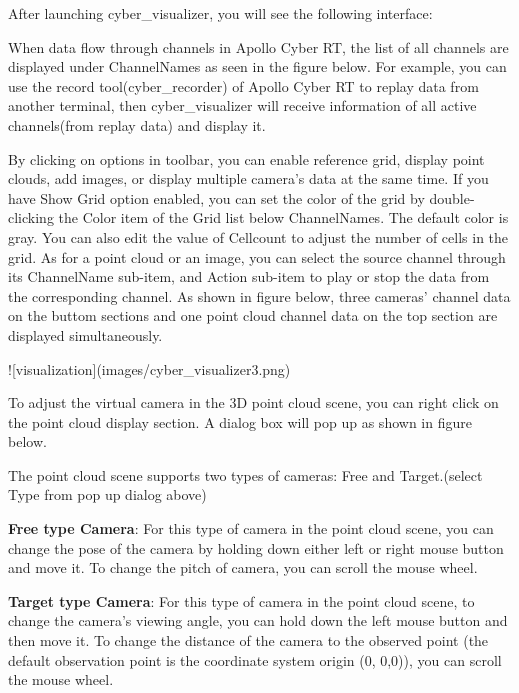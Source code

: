 \begin{DoxyItemize}
\item After launching cyber\-\_\-visualizer, you will see the following interface\-:


\item When data flow through channels in Apollo Cyber R\-T, the list of all channels are displayed under {\ttfamily Channel\-Names} as seen in the figure below. For example, you can use the record tool(cyber\-\_\-recorder) of Apollo Cyber R\-T to replay data from another terminal, then {\ttfamily cyber\-\_\-visualizer} will receive information of all active channels(from replay data) and display it.


\item By clicking on options in toolbar, you can enable reference grid, display point clouds, add images, or display multiple camera's data at the same time. If you have {\ttfamily Show Grid} option enabled, you can set the color of the grid by double-\/clicking the {\ttfamily Color} item of the {\ttfamily Grid} list below {\ttfamily Channel\-Names}. The default color is gray. You can also edit the value of {\ttfamily Cellcount} to adjust the number of cells in the grid. As for a point cloud or an image, you can select the source channel through its {\ttfamily Channel\-Name} sub-\/item, and {\ttfamily Action} sub-\/item to play or stop the data from the corresponding channel. As shown in figure below, three cameras' channel data on the buttom sections and one point cloud channel data on the top section are displayed simultaneously. \begin{DoxyVerb}![visualization](images/cyber_visualizer3.png)
\end{DoxyVerb}

\item To adjust the virtual camera in the 3\-D point cloud scene, you can right click on the point cloud display section. A dialog box will pop up as shown in figure below.



The point cloud scene supports two types of cameras\-: Free and Target.(select Type from pop up dialog above)
\begin{DoxyItemize}
\item {\bfseries Free type Camera}\-: For this type of camera in the point cloud scene, you can change the pose of the camera by holding down either left or right mouse button and move it. To change the pitch of camera, you can scroll the mouse wheel.
\item {\bfseries Target type Camera}\-: For this type of camera in the point cloud scene, to change the camera's viewing angle, you can hold down the left mouse button and then move it. To change the distance of the camera to the observed point (the default observation point is the coordinate system origin (0, 0,0)), you can scroll the mouse wheel.
\end{DoxyItemize}


\end{DoxyItemize}
